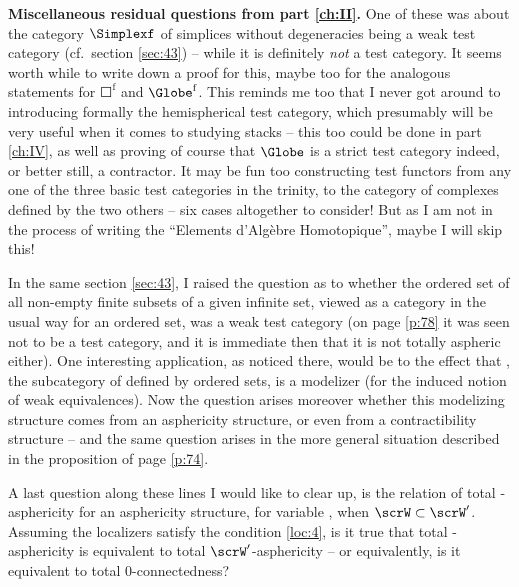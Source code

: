 \enspace\textbf{Miscellaneous residual
  questions from part \ref{ch:II}.} One of these was about the category
$\Simplexf$ of simplices without degeneracies being a weak test
category (cf.\ section \ref{sec:43}) -- while it is definitely
\emph{not} a test category. It seems worth while to write down a proof
for this, maybe too for the analogous statements for
$\Square^{\mathrm f}$ and $\Globe^{\mathrm f}$. This reminds
me too that I never got around to introducing formally the
hemispherical test category, which presumably will be very useful when
it comes to studying stacks -- this too could be done in part
\ref{ch:IV}, as well as proving of course that $\Globe$ is a strict
test category indeed, or better still, a contractor. It may be fun too
constructing test functors from any one of the three basic test
categories in the trinity, to the category of complexes defined by the
two others -- six cases altogether to consider! But as I am not in the
process of writing the ``Elements d'Algèbre
Homotopique'', maybe I will skip this!

In the same section \ref{sec:43}, I raised the question as to whether
the ordered set of all non-empty finite subsets of a given infinite
set, viewed as a category in the usual way for an ordered set, was a
weak test category (on page \ref{p:78} it was seen not to be a test
category, and it is immediate then that it is not totally aspheric
either). One interesting application, as noticed there, would be to
the effect that \Ord, the subcategory of \Cat{} defined by ordered
sets, is a modelizer (for the induced notion of weak
equivalences). Now the question arises moreover whether this
modelizing structure comes from an asphericity structure, or even from
a contractibility structure -- and the same question arises in the
more general situation described in the proposition of page
\ref{p:74}.

A last question along these lines I would like to clear up, is the
relation of total \scrW-asphericity for an asphericity structure, for
variable \scrW, when $\scrW\subset\scrW'$. Assuming the localizers
satisfy the condition \ref{loc:4}, is it true that total
\scrW-asphericity is equivalent to total $\scrW'$-asphericity -- or
equivalently, is it equivalent to total $0$-connectedness?

\bigbreak

\noindent\hfill{}\par


